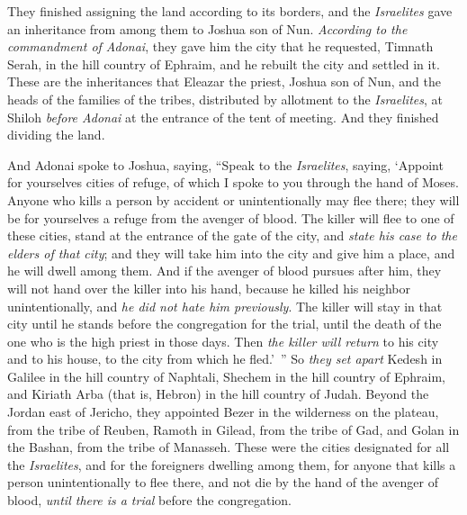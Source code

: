 \begin{biblechapter}
 They finished assigning the land according to its borders, and the \textit{Israelites} gave an inheritance from among them to Joshua son of Nun.
\verse \textit{According to the commandment of Adonai}, they gave him the city that he requested, Timnath Serah, in the hill country of Ephraim, and he rebuilt the city and settled in it.
\verse These are the inheritances that Eleazar the priest, Joshua son of Nun, and the heads of the families of the tribes, distributed by allotment to the \textit{Israelites}, at Shiloh \textit{before Adonai} at the entrance of the tent of meeting. And they finished dividing the land.
\end{biblechapter}

\begin{biblechapter} %
 And Adonai spoke to Joshua, saying,
\verse “Speak to the \textit{Israelites}, saying, ‘Appoint for yourselves cities of refuge, of which I spoke to you through the hand of Moses.
\verse Anyone who kills a person by accident or unintentionally may flee there; they will be for yourselves a refuge from the avenger of blood.
\verse The killer will flee to one of these cities, stand at the entrance of the gate of the city, and \textit{state his case to the elders of that city}; and they will take him into the city and give him a place, and he will dwell among them.
\verse And if the avenger of blood pursues after him, they will not hand over the killer into his hand, because he killed his neighbor unintentionally, and \textit{he did not hate him previously}.
\verse The killer will stay in that city until he stands before the congregation for the trial, until the death of the one who is the high priest in those days. Then \textit{the killer will return} to his city and to his house, to the city from which he fled.’ ”
\verse So \textit{they set apart} Kedesh in Galilee in the hill country of Naphtali, Shechem in the hill country of Ephraim, and Kiriath Arba (that is, Hebron) in the hill country of Judah.
\verse Beyond the Jordan east of Jericho, they appointed Bezer in the wilderness on the plateau, from the tribe of Reuben, Ramoth in Gilead, from the tribe of Gad, and Golan in the Bashan, from the tribe of Manasseh.
\verse These were the cities designated for all the \textit{Israelites}, and for the foreigners dwelling among them, for anyone that kills a person unintentionally to flee there, and not die by the hand of the avenger of blood, \textit{until there is a trial} before the congregation.
\end{biblechapter}


